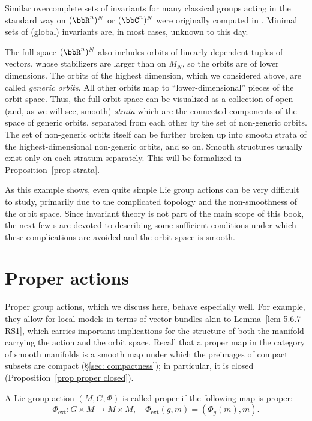 \begin{example}
    Similar overcomplete sets of invariants for many classical groups acting in the standard way on $(\bbR^n)^N$ or $(\bbC^n)^N$ were originally computed in \cite{Weyl}. Minimal sets of (global) invariants are, in most cases, unknown to this day.

    The full space $(\bbR^n)^N$ also includes orbits of linearly dependent tuples of vectors, whose stabilizers are larger than on $M_N$, so the orbits are of lower dimensions. The orbits of the highest dimension, which we considered above, are called \emph{generic orbits}. All other orbits map to ``lower-dimensional'' pieces of the orbit space. Thus, the full orbit space can be visualized as a collection of open (and, as we will see, smooth) \emph{strata} which are the connected components of the space of generic orbits, separated from each other by the set of non-generic orbits. The set of non-generic orbits itself can be further broken up into smooth strata of the highest-dimensional non-generic orbits, and so on. Smooth structures usually exist only on each stratum separately. This will be formalized in Proposition~\ref{prop strata}.
\end{example}

As this example shows, even quite simple Lie group actions can be very difficult to study, primarily due to the complicated topology and the non-smoothness of the orbit space. Since invariant theory is not part of the main scope of this book, the next few \sect s are devoted to describing some sufficient conditions under which these complications are avoided and the orbit space is smooth.






\section{Proper actions}


Proper group actions, which we discuss here, behave especially well. For example, they allow for local models in terms of vector bundles akin to Lemma~\ref{lem 5.6.7 RS1}, which carries important implications for the structure of both the manifold carrying the action and the orbit space. Recall that a proper map in the category of smooth manifolds is a smooth map under which the preimages of compact subsets are compact (\S\ref{sec: compactness}); in particular, it is closed (Proposition~\ref{prop proper closed}).

\begin{defn}
    A Lie group action $(M,G,\Phi)$ is called proper if the following map is proper:
    \[\Phi_{\mathrm{ext}}:G\times M\to M\times M,\quad \Phi_{\mathrm{ext}}(g,m)=\left(\Phi_g(m),m\right).\]
\end{defn}

